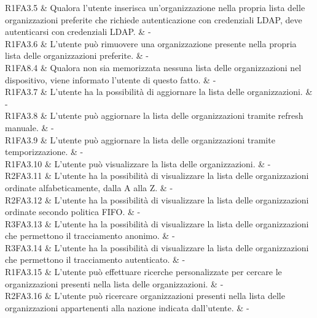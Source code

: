 R1FA3.5 & Qualora l’utente inserisca un'organizzazione nella propria lista delle organizzazioni preferite che richiede autenticazione con credenziali LDAP, deve autenticarsi con credenziali LDAP. & - \\

R1FA3.6 & L’utente può rimuovere una organizzazione presente nella propria lista delle organizzazioni preferite.  & - \\

R1FA8.4 & Qualora non sia memorizzata nessuna lista delle organizzazioni nel dispositivo, viene informato l’utente di questo fatto.  & - \\

R1FA3.7 & L’utente ha la possibilità di aggiornare la lista delle organizzazioni.  & - \\

R1FA3.8 & L’utente può aggiornare la lista delle organizzazioni tramite refresh manuale.  & - \\

R1FA3.9 & L’utente può aggiornare la lista delle organizzazioni tramite temporizzazione. & - \\

R1FA3.10 & L’utente può visualizzare la lista delle organizzazioni. & - \\

R2FA3.11 & L’utente ha la possibilità di visualizzare la lista delle organizzazioni ordinate alfabeticamente, dalla A alla Z.  & - \\

R2FA3.12 & L’utente ha la possibilità di visualizzare la lista delle organizzazioni ordinate secondo politica FIFO.  & - \\

R3FA3.13 & L’utente ha la possibilità di visualizzare la lista delle organizzazioni che permettono il tracciamento anonimo. & - \\

R3FA3.14 & L’utente ha la possibilità di visualizzare la lista delle organizzazioni che permettono il tracciamento autenticato.  & - \\

R1FA3.15 & L’utente può effettuare ricerche personalizzate per cercare le organizzazioni presenti nella lista delle organizzazioni.  & - \\

R2FA3.16 & L’utente può ricercare organizzazioni presenti nella lista delle organizzazioni appartenenti alla nazione indicata dall’utente. & - \\

